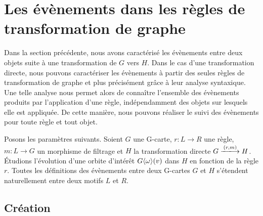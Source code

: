 


\section{Les évènements dans les règles de transformation de graphe}
\label{sec:formalisation-evenements-regles-transfo-graphe}

Dans la section précédente, nous avons caractérisé les évènements entre deux
objets suite à une transformation de $G$ vers $H$. %
Dans le cas d'une transformation directe, nous pouvons caractériser les
évènements à partir des seules règles de transformation de graphe et plus
précisément grâce à leur analyse syntaxique. %
Une telle analyse nous permet alors de connaître l'ensemble des évènements produits par l'application d'une règle, indépendamment des objets sur lesquels elle est appliquée. %
De cette manière, nous pouvons réaliser le suivi des évènements pour toute règle
et tout objet. %

Posons les paramètres suivants. %
Soient $G$ une G-carte, $r : L \longrightarrow R$ une règle, $m : L \to G$ un morphisme de
filtrage et $H$ la transformation directe $G \xlongrightarrow{(r,m)} H$. %
Étudions l'évolution d'une orbite d'intérêt $G\langle\omega\rangle(v)$ dans $H$ en fonction
de la règle $r$. Toutes les définitions des évènements entre deux G-cartes $G$ et $H$ s'étendent
naturellement entre deux motifs $L$ et $R$. %



\subsection{Création}
\label{sec:formalisation-evenements-regles-transfo-graphe-creation}

